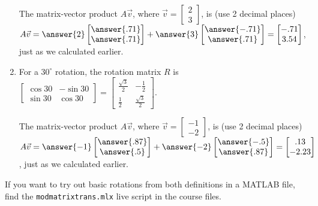 \documentclass{ximera}
\begin{document}
\begin{example}
\begin{enumerate}
                The matrix-vector product $A\vec{v}$, where $\vec{v}=\begin{bmatrix} 2 \\ 3 \end{bmatrix}$, is (use 2 decimal places) $A\vec{v}=\answer{2}\begin{bmatrix} \answer{.71} \\ \answer{.71} \end{bmatrix} + \answer{3}\begin{bmatrix} \answer{-.71} \\ \answer{.71} \end{bmatrix} = \begin{bmatrix} -.71 \\ 3.54 \end{bmatrix}$, just as we calculated earlier.

                \item For a $30^\circ$ rotation, the rotation matrix $R$ is $\begin{bmatrix} \cos 30 & -\sin 30 \\ \sin 30 & \cos 30 \end{bmatrix} = \begin{bmatrix} \frac{\sqrt{3}}{2} & -\frac{1}{2} \\ \frac{1}{2} & \frac{\sqrt{3}}{2} \end{bmatrix}$.
                
                The matrix-vector product $A\vec{v}$, where $\vec{v}=\begin{bmatrix} -1 \\ -2 \end{bmatrix}$, is (use 2 decimal places) $A\vec{v}=\answer{-1}\begin{bmatrix} \answer{.87} \\ \answer{.5} \end{bmatrix} + \answer{-2}\begin{bmatrix} \answer{-.5} \\ \answer{.87} \end{bmatrix} = \begin{bmatrix} .13 \\ -2.23 \end{bmatrix}$, just as we calculated earlier.
            \end{enumerate}

            \begin{hint}
            
                If you want to try out basic rotations from both definitions in a MATLAB file, find the \texttt{mod\textunderscore matrix\textunderscore trans.mlx} live script in the course files.

            \end{hint}

        \end{example}
\end{document}
